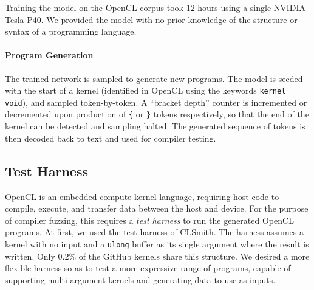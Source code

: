 Training the model on the OpenCL corpus took 12 hours using a single NVIDIA Tesla P40. We provided the model with no prior knowledge of the structure or syntax of a programming language.


\paragraph{Program Generation} The trained network is sampled to generate new programs. The model is seeded with the start of a kernel (identified in OpenCL using the keywords \texttt{kernel void}), and sampled token-by-token. A ``bracket depth'' counter is incremented or decremented upon production of \texttt{\{} or \texttt{\}} tokens respectively, so that the end of the kernel can be detected and sampling halted. The generated sequence of tokens is then decoded back to text and used for compiler testing.


\subsection{Test Harness\label{sec:test-harness}}

OpenCL is an embedded compute kernel language, requiring host code to compile, execute, and transfer data between the host and device. For the purpose of compiler fuzzing, this requires a \emph{test harness} to run the generated OpenCL programs. At first, we used the test harness of CLSmith. The harness assumes a kernel with no input and a \texttt{ulong} buffer as its single argument where the result is written. Only 0.2\% of the GitHub kernels share this structure. We desired a more flexible harness so as to test a more expressive range of programs, capable of supporting multi-argument kernels and generating data to use as inputs.

